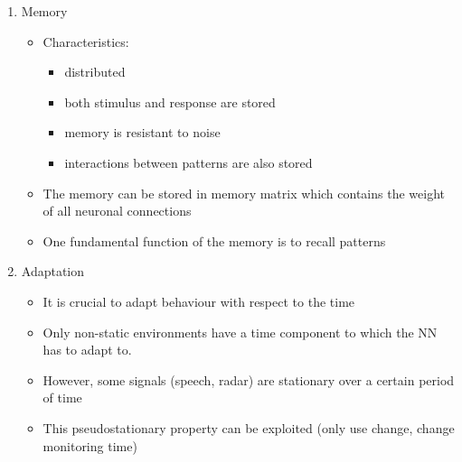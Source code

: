 \documentclass{scrartcl}
\begin{document}
\begin{enumerate}
\item Memory
	\begin{itemize}
	\item Characteristics:
		\begin{itemize}
		\item distributed
		\item both stimulus and response are stored 
		\item memory is resistant to noise
		\item interactions between patterns are also stored
		\end{itemize}
	\item The memory can be stored in memory matrix which contains the weight of all neuronal connections
	\item One fundamental function of the memory is to recall patterns
	\end{itemize}
	
\item Adaptation
	\begin{itemize}
	\item It is crucial to adapt behaviour with respect to the time
	\item Only non-static environments have a time component to which the NN has to adapt to.
	\item  However, some signals (speech, radar) are stationary over a certain period of time
	\item This pseudostationary property can be exploited (only use change, change monitoring time)
	\end{itemize}
\end{enumerate}
\end{document}
